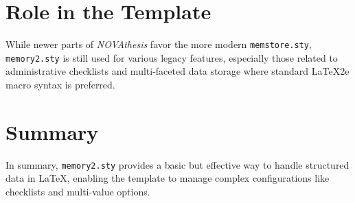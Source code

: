 \section{Role in the Template}
While newer parts of \emph{NOVAthesis} favor the more modern \texttt{memstore.sty}, \texttt{memory2.sty} is still used for various legacy features, especially those related to administrative checklists and multi-faceted data storage where standard \LaTeX2e macro syntax is preferred.

\section{Summary}
In summary, \texttt{memory2.sty} provides a basic but effective way to handle structured data in \LaTeX{}, enabling the template to manage complex configurations like checklists and multi-value options.
